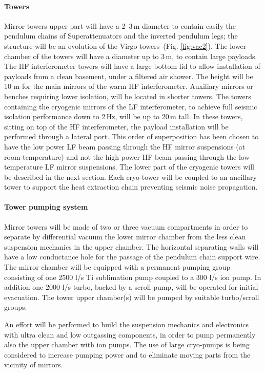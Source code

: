 \paragraph{Towers}

Mirror towers upper part will have a 2--3\,m diameter to contain easily the pendulum chains of Superattenuators and the inverted pendulum legs; the structure will be an evolution of the Virgo towers~(Fig. \ref{fig:vac2}). The lower chamber of the towers will have a diameter up to 3\,m, to contain large payloads. The HF interferometer towers will have a large bottom lid to allow installation of payloads from a clean basement, under a filtered air shower. The height will be 10 m for the main mirrors of the warm HF interferometer. Auxiliary mirrors or benches requiring lower isolation, will be located in shorter towers. The towers containing the cryogenic mirrors of the LF interferometer, to achieve full seismic isolation performance down to 2\,Hz, will be up to 20\,m tall. In these towers, sitting on top of the HF interferometer, the payload installation will be performed through a lateral port. This order of superposition has been chosen to have the low power LF beam passing through the HF mirror suspensions (at room temperature) and not the high power HF beam passing through the low temperature LF mirror suspensions. The lower part of the cryogenic towers will be described in the next section. Each cryo-tower will be coupled to an ancillary tower to support the heat extraction chain preventing seismic noise propagation.

\paragraph{Tower pumping system}

Mirror towers will be made of two or three vacuum compartments in order to separate by differential vacuum the lower mirror chamber from the less clean suspension mechanics in the upper chamber. The horizontal separating walls will have a low conductance hole for the passage of the pendulum chain support wire. The mirror chamber will be equipped with a permanent pumping group consisting of one 2500 l/s Ti sublimation pump coupled to a 300 l/s ion pump. In addition one 2000 l/s turbo, backed by a scroll pump, will be operated for initial evacuation. The tower upper chamber(s) will be pumped by suitable turbo/scroll groups.

An effort will be performed to build the suspension mechanics and electronics with ultra clean and low outgassing components, in order to pump permanently also the upper chamber with ion pumps. The use of large cryo-pumps is being considered to increase pumping power and to eliminate moving parts from the vicinity of mirrors.

